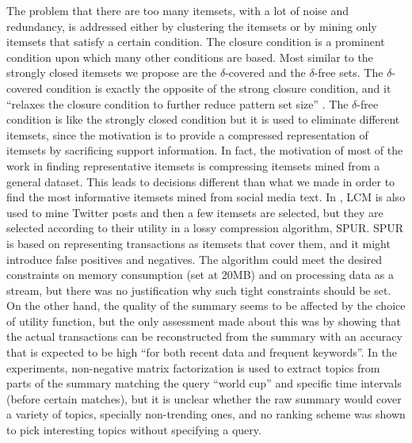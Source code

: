 \documentclass{sig-alternate}
\begin{document}
The problem that there are too many itemsets, with a lot of noise and redundancy, is addressed either by clustering \cite{yan2005summarizing} the itemsets or by mining only itemsets that satisfy a certain condition. The closure condition \cite{pasquier1999discovering} is a prominent condition upon which many other conditions are based. Most similar to the strongly closed itemsets we  propose are the $\delta$-covered \cite{xin2005mining} and the $\delta$-free \cite{boulicaut2003free} sets. The $\delta$-covered condition is exactly the opposite of the strong closure condition, and it ``relaxes the closure condition to further reduce pattern set size'' \cite{liu2012finding}. The $\delta$-free condition is like the strongly closed condition but it is used to eliminate different itemsets, since the motivation is to provide a compressed representation of itemsets by sacrificing support information. In fact, the motivation of most of the work in finding representative itemsets is compressing itemsets mined from a general dataset. This leads to decisions different than what  we made in order to find the most informative itemsets mined from social media text. In %
\cite{yang2012framework}, LCM is also used to mine Twitter posts and then a few itemsets are selected, but they are selected according to their utility in a
lossy compression algorithm, SPUR. SPUR is based on representing transactions as itemsets that cover them, and it might introduce false positives and negatives. The algorithm could meet the desired  constraints on memory consumption (set at 20MB) and on processing data as a stream, but there was no justification why such tight constraints should be set. On the other hand, the quality of the summary seems to be affected by the choice of utility function, but the only assessment made about this was by showing that the actual transactions can be reconstructed from the summary with an accuracy that is expected to be high ``for both recent data and frequent keywords''. In the experiments, non-negative matrix factorization is used to extract topics from parts of the summary matching the query ``world cup'' and specific time intervals (before certain matches), but it is unclear whether the raw summary would cover a variety of topics, specially non-trending ones, and no ranking scheme was shown to pick interesting topics without specifying a query.
\end{document}
